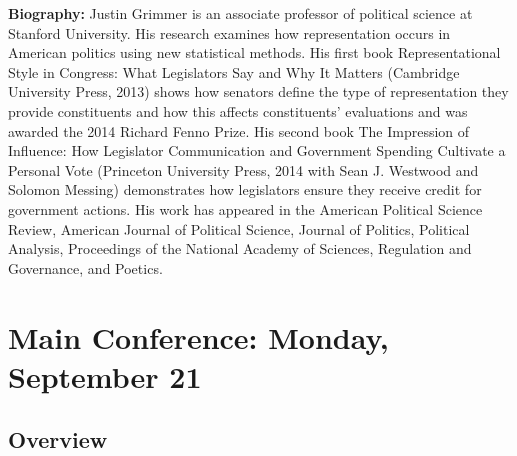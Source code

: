 \noindent \textbf{Biography:} Justin Grimmer is an associate professor
of political science at Stanford University. His research examines
how representation occurs in American politics using new statistical
methods. His first book Representational Style in Congress: What Legislators
Say and Why It Matters (Cambridge University Press, 2013) shows how
senators define the type of representation they provide constituents
and how this affects constituents' evaluations and was awarded the
2014 Richard Fenno Prize. His second book The Impression of Influence:
How Legislator Communication and Government Spending Cultivate a Personal
Vote (Princeton University Press, 2014 with Sean J. Westwood and Solomon
Messing) demonstrates how legislators ensure they receive credit for
government actions. His work has appeared in the American Political
Science Review, American Journal of Political Science, Journal of
Politics, Political Analysis, Proceedings of the National Academy
of Sciences, Regulation and Governance, and Poetics.

\clearpage{}









\chapter{Main Conference: Monday, September 21}


\section*{Overview}



\clearpage{}








